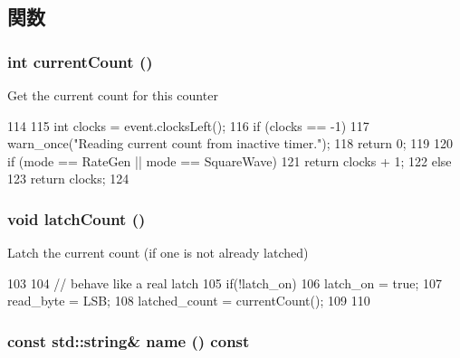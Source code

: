 \subsection{関数}
\hypertarget{classIntel8254Timer_1_1Counter_a6e7edf97a0e9c17b694fcf76c62fab7a}{
\subsubsection[{currentCount}]{\setlength{\rightskip}{0pt plus 5cm}int currentCount ()}}
\label{classIntel8254Timer_1_1Counter_a6e7edf97a0e9c17b694fcf76c62fab7a}
Get the current count for this counter 


\begin{DoxyCode}
114 {
115     int clocks = event.clocksLeft();
116     if (clocks == -1) {
117         warn_once("Reading current count from inactive timer.\n");
118         return 0;
119     }
120     if (mode == RateGen || mode == SquareWave)
121         return clocks + 1;
122     else
123         return clocks;
124 }
\end{DoxyCode}
\hypertarget{classIntel8254Timer_1_1Counter_a8002cc449afaedfc055ee4160b60fb0c}{
\subsubsection[{latchCount}]{\setlength{\rightskip}{0pt plus 5cm}void latchCount ()}}
\label{classIntel8254Timer_1_1Counter_a8002cc449afaedfc055ee4160b60fb0c}
Latch the current count (if one is not already latched) 


\begin{DoxyCode}
103 {
104     // behave like a real latch
105     if(!latch_on) {
106         latch_on = true;
107         read_byte = LSB;
108         latched_count = currentCount();
109     }
110 }
\end{DoxyCode}
\hypertarget{classIntel8254Timer_1_1Counter_a324e8c54c4c5161913681a1a52fef959}{
\subsubsection[{name}]{\setlength{\rightskip}{0pt plus 5cm}const std::string\& name () const}}
\label{classIntel8254Timer_1_1Counter_a324e8c54c4c5161913681a1a52fef959}



